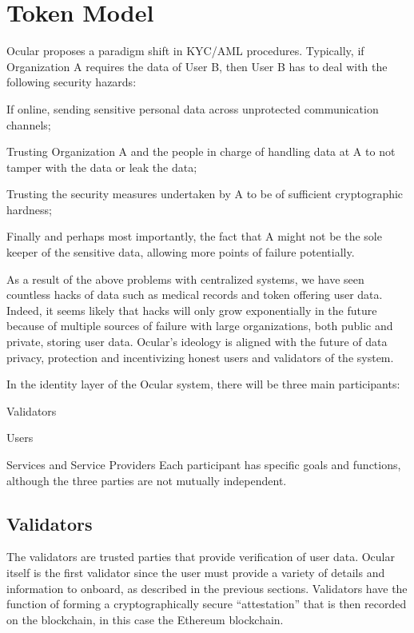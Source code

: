 \documentclass[a4paper]{article}
\let\tempone\itemize
\let\temptwo\enditemize
\renewenvironment{itemize}{\tempone\addtolength{\itemsep}{-5pt}}{\temptwo}
\begin{document}
\section{Token Model}

Ocular proposes a paradigm shift in KYC/AML procedures. Typically, if Organization A requires the data of User B, then User B has to deal with the following security hazards:
\begin{itemize}
\item If online, sending sensitive personal data across unprotected communication channels;
\item Trusting Organization A and the people in charge of handling data at A to not tamper with the data or leak the data;
\item Trusting the security measures undertaken by A to be of sufficient cryptographic hardness; 
\item Finally and perhaps most importantly, the fact that A might not be the sole keeper of the sensitive data, allowing more points of failure potentially. 
\end{itemize}

As a result of the above problems with centralized systems, we have seen countless hacks of data such as medical records and token offering user data. Indeed, it seems likely that hacks will only grow exponentially in the future because of multiple sources of failure with large organizations, both public and private, storing user data. Ocular's ideology is aligned with the future of data privacy, protection and incentivizing honest users and validators of the system.

In the identity layer of the Ocular system, there will be three main participants:
\begin{itemize}
\item Validators
\item Users
\item Services and Service Providers
\end{itemize}
Each participant has specific goals and functions, although the three parties are not mutually independent. 
\subsection{Validators}
The validators are trusted parties that provide verification of user data. Ocular itself is the first validator since the user must provide a variety of details and information to onboard, as described in the previous sections. Validators have the function of forming a cryptographically secure ``attestation'' that is then recorded on the blockchain, in this case the Ethereum blockchain. 
\end{document}

